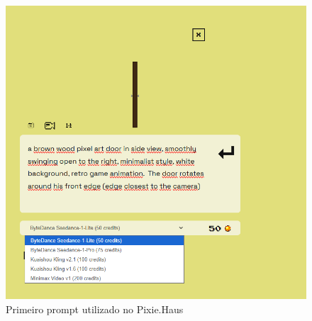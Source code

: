\begin{figure}[htbp]
    \centering
    \caption{\small Primeiro prompt utilizado no Pixie.Haus}
    \label{fig:pixieHausPrompt1}
    \includegraphics[width=0.6\linewidth]{figs/pixieHaus/tela2.PNG}
\end{figure}

